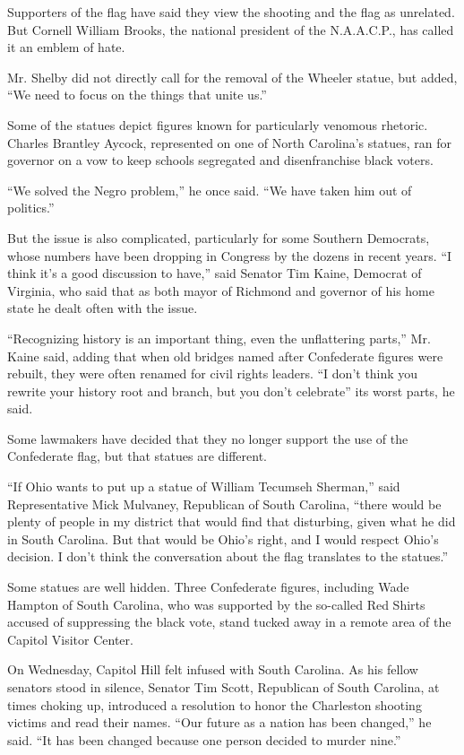 Supporters of the flag have said they view the shooting and the flag as
unrelated. But Cornell William Brooks, the national president of the
N.A.A.C.P., has called it an emblem of hate.

Mr. Shelby did not directly call for the removal of the Wheeler statue,
but added, ``We need to focus on the things that unite us.''

Some of the statues depict figures known for particularly venomous
rhetoric. Charles Brantley Aycock, represented on one of North
Carolina's statues, ran for governor on a vow to keep schools segregated
and disenfranchise black voters.

``We solved the Negro problem,'' he once said. ``We have taken him out
of politics.''

But the issue is also complicated, particularly for some Southern
Democrats, whose numbers have been dropping in Congress by the dozens in
recent years. ``I think it's a good discussion to have,'' said Senator
Tim Kaine, Democrat of Virginia, who said that as both mayor of Richmond
and governor of his home state he dealt often with the issue.

``Recognizing history is an important thing, even the unflattering
parts,'' Mr. Kaine said, adding that when old bridges named after
Confederate figures were rebuilt, they were often renamed for civil
rights leaders. ``I don't think you rewrite your history root and
branch, but you don't celebrate'' its worst parts, he said.

Some lawmakers have decided that they no longer support the use of the
Confederate flag, but that statues are different.

``If Ohio wants to put up a statue of William Tecumseh Sherman,'' said
Representative Mick Mulvaney, Republican of South Carolina, ``there
would be plenty of people in my district that would find that
disturbing, given what he did in South Carolina. But that would be
Ohio's right, and I would respect Ohio's decision. I don't think the
conversation about the flag translates to the statues.''

Some statues are well hidden. Three Confederate figures, including Wade
Hampton of South Carolina, who was supported by the so-called Red Shirts
accused of suppressing the black vote, stand tucked away in a remote
area of the Capitol Visitor Center.

On Wednesday, Capitol Hill felt infused with South Carolina. As his
fellow senators stood in silence, Senator Tim Scott, Republican of South
Carolina, at times choking up, introduced a resolution to honor the
Charleston shooting victims and read their names. ``Our future as a
nation has been changed,'' he said. ``It has been changed because one
person decided to murder nine.''

